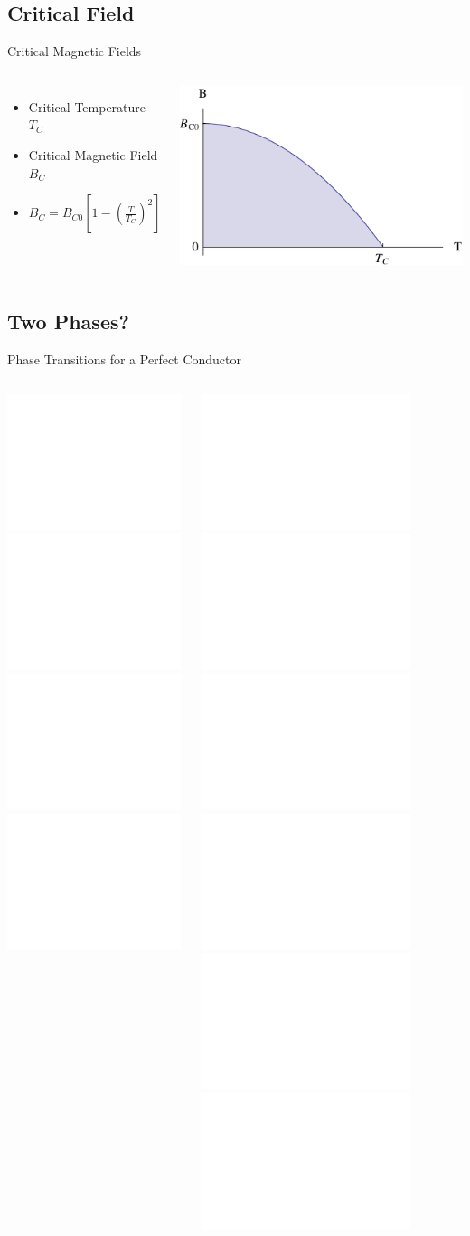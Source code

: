 \documentclass{beamer}
\begin{document}
\subsection{Critical Field}
\begin{frame}{Critical Magnetic Fields}
\begin{columns}

\begin{itemize}[<+->]
\item \small Critical Temperature $T_C$
\item \small Critical Magnetic Field $B_C$
\item \small $B_C=B_{C0} \left[ 1 - \left(\frac{T}{T_C}\right)^2 \right]$
\end{itemize}    
            
\includegraphics[width=\textwidth]{img/tb0.pdf}
\end{columns}

\end{frame}




\subsection{Two Phases?}
\begin{frame}{Phase Transitions for a Perfect Conductor}

\begin{columns}


\centering \includegraphics<1-2>[height=0.6\textheight]{img/no.pdf}
\includegraphics<3>[height=0.6\textheight]{img/nichdurch.pdf}
\centering \includegraphics<4>[height=0.6\textheight]{img/no.pdf}
\includegraphics<5-6>[height=0.6\textheight]{img/durch.pdf}

 
 
\includegraphics<1>[width=0.8\textwidth]{img/tb1.pdf}
\includegraphics<2>[width=0.8\textwidth]{img/tb4.pdf}
\includegraphics<3>[width=0.8\textwidth]{img/tb5.pdf}
\includegraphics<4>[width=0.8\textwidth]{img/tb1.pdf}
\includegraphics<5>[width=0.8\textwidth]{img/tb2.pdf}                    
\includegraphics<6>[width=0.8\textwidth]{img/tb3.pdf}

\end{columns}
\end{frame}
\end{document}
